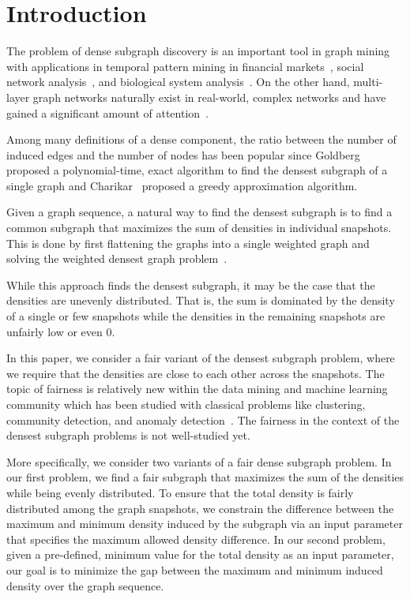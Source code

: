 \section{Introduction}

The problem of dense subgraph discovery is an important tool in graph mining with applications in temporal pattern mining in financial markets~\cite{xiaoxi2009migration}, social network analysis~\cite{semertzidis2019finding}, and biological system analysis~\cite{fratkin2006motifcut}. 
On the other hand, multi-layer graph networks naturally exist in real-world, complex networks and have gained a significant amount of attention~\cite{jethava2015finding,semertzidis2019finding,rozenshtein2020finding,galimberti2020core,arachchi2023jaccard}.

Among many definitions of a dense component, the ratio between the number of induced edges and the number of nodes has been popular since Goldberg~\cite{goldberg1984finding}
proposed a polynomial-time, exact algorithm to find the densest subgraph of a single graph and Charikar~\cite{charikar2000greedy} proposed a greedy approximation algorithm.

Given a graph sequence, a natural way to find the densest subgraph is to find a common subgraph that maximizes the sum of densities in individual snapshots. This is done by first flattening the graphs into a single weighted graph and solving the weighted densest graph problem~\cite{semertzidis2019finding}.

While this approach finds the densest subgraph, it may be the case that the densities are unevenly distributed. That is, the sum is dominated by the density of a single or few snapshots while the densities in the remaining snapshots are unfairly low or even 0.

In this paper, we consider a fair variant of the densest subgraph problem, where we require that the densities are close to each other across the snapshots. 
The topic of fairness is relatively new within the data mining and machine learning community which has been studied with classical problems like clustering, community detection, and anomaly detection~\cite{ahmadian2019clustering,mehrabi2019debiasing, mehrabi2021survey,anagnostopoulos2020spectral}.
The fairness in the context of the densest subgraph problems is not well-studied yet.


More specifically, we consider two variants of a fair dense subgraph problem.
In our first problem, we find a fair subgraph that maximizes the sum of the densities while being evenly distributed.
To ensure that the total density is fairly distributed among the graph snapshots, we constrain the difference between the maximum and minimum density induced by the subgraph via an input parameter that specifies the maximum allowed density difference.
In our second problem, given a pre-defined, minimum value for the total density as an input parameter, our goal is to minimize the gap between the maximum and minimum induced density over the graph sequence.
 
